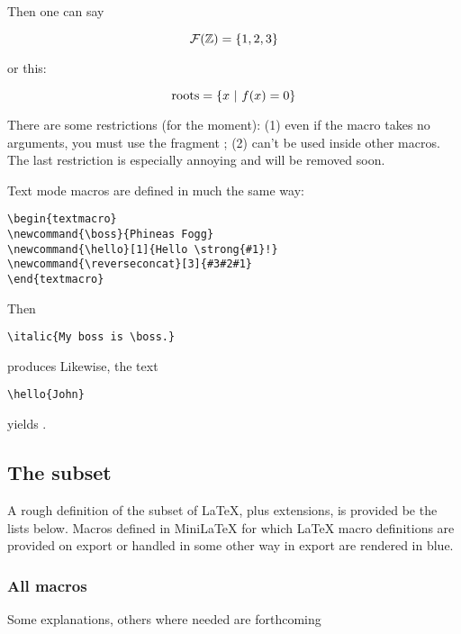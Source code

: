 Then one can say

$$
\mathcal{F}(\mathbb{Z}) = \{1,2,3\}
$$

or this:

$$
\text{roots} = \{  x\ |\  f(x) = 0  \}
$$

There are some restrictions (for the moment): (1) even if the macro takes no arguments, you must use the fragment \code{[0]}; (2) can't be used inside other macros.  The last restriction is especially annoying and will be removed soon.

Text mode macros are defined in much the same way:

\begin{textmacro}
\newcommand{\boss}{Phineas Fogg}
\newcommand{\hello}[1]{Hello \strong{#1}!}
\newcommand{\reverseconcat}[3]{#3#2#1}
\end{textmacro}

\begin{verbatim}
\begin{textmacro}
\newcommand{\boss}{Phineas Fogg}
\newcommand{\hello}[1]{Hello \strong{#1}!}
\newcommand{\reverseconcat}[3]{#3#2#1}
\end{textmacro}
\end{verbatim}

Then

\begin{verbatim}
\italic{My boss is \boss.}
\end{verbatim}

produces 
Likewise, the text

\begin{verbatim}
\hello{John}
\end{verbatim}

yields .

\subsection{The subset}

A rough definition of the subset of LaTeX, plus extensions, is provided
be the lists below.  Macros defined in MiniLaTeX for which LaTeX macro definitions are provided on export or handled in some other way in export are rendered in blue.

\subsubsection{All macros}

Some explanations, others where needed are forthcoming

